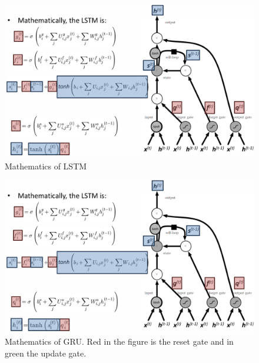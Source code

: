 \documentclass[../Main.tex]{subfiles}
\begin{document}
\begin{figure}[H]
    \centering
    \includegraphics[width=1\linewidth]{Images/deepl/lstm-math.png}
    \caption{Mathematics of LSTM}
\end{figure}

\begin{figure}[H]
    \centering
    \includegraphics[width=1\linewidth]{Images/deepl/lstm-math.png}
    \caption{Mathematics of GRU. Red in the figure is the reset gate and in green the update gate.}
\end{figure}
\end{document}
